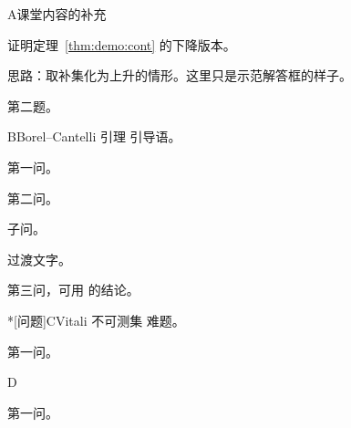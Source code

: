 \documentclass{yupin-notes}
\begin{document}

\begin{exercises}{A}{课堂内容的补充}
  \item\label{ex:demo:A1} 证明定理~\ref{thm:demo:cont} 的下降版本。
  \begin{solution}
  思路：取补集化为上升的情形。这里只是示范解答框的样子。
  \end{solution}
  \item 第二题。
\end{exercises}

\begin{probleme}{B}{Borel–Cantelli 引理}
引导语。
\begin{questions}
  \item 第一问。
  \item 第二问。
  \begin{questions}\item 子问。\end{questions}
\end{questions}
过渡文字。
\begin{questions}[resume]
  \item 第三问，可用  的结论。
\end{questions}
\end{probleme}

\thinkingpart
\begin{probleme}*[问题]{C}{Vitali 不可测集}
难题。
\begin{questions}\item 第一问。\end{questions}
\end{probleme}

\begin{probleme}{D}{}
\begin{questions}\item 第一问。\end{questions}
\end{probleme}
\end{document}
